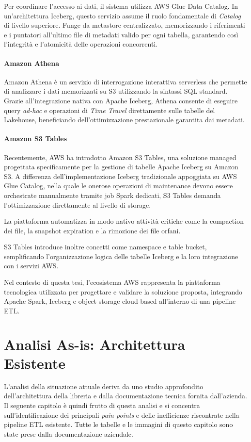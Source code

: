 \documentclass[12pt,a4paper,openright,twoside]{book}
\begin{document}
Per coordinare l'accesso ai dati, il sistema utilizza AWS Glue Data Catalog. 
In un'architettura Iceberg, questo servizio assume il ruolo fondamentale di \textit{Catalog} di livello superiore. Funge da metastore centralizzato, memorizzando i riferimenti e i puntatori all'ultimo file di metadati valido per ogni tabella, garantendo così l'integrità e l'atomicità delle operazioni concorrenti.

\subsubsection{Amazon Athena}

Amazon Athena è un servizio di interrogazione interattiva serverless che permette di analizzare i dati memorizzati su S3 utilizzando la sintassi SQL standard. 
Grazie all'integrazione nativa con Apache Iceberg, Athena consente di eseguire query \textit{ad-hoc} e operazioni di \textit{Time Travel} direttamente sulle tabelle del Lakehouse, beneficiando dell'ottimizzazione prestazionale garantita dai metadati.

\subsubsection{Amazon S3 Tables}

Recentemente, AWS ha introdotto Amazon S3 Tables, una soluzione managed progettata specificamente per la gestione di tabelle Apache Iceberg su Amazon S3. 
A differenza dell'implementazione Iceberg tradizionale appoggiata su AWS Glue Catalog, nella quale le onerose operazioni di maintenance devono essere orchestrate manualmente tramite job Spark dedicati, S3 Tables demanda l'ottimizzazione direttamente al livello di storage. 

La piattaforma automatizza in modo nativo attività critiche come la compaction dei file, la snapshot expiration e la rimozione dei file orfani.

S3 Tables introduce inoltre concetti come namespace e table bucket, semplificando l’organizzazione logica delle tabelle Iceberg e la loro integrazione con i servizi AWS.

Nel contesto di questa tesi, l’ecosistema AWS rappresenta la piattaforma tecnologica utilizzata per progettare e validare la soluzione proposta, integrando Apache Spark, Iceberg e object storage cloud-based all’interno di una pipeline ETL.

\chapter{Analisi As-is: Architettura Esistente}
\label{chap:existing-architecture}
L'analisi della situazione attuale deriva da uno studio approfondito dell'architettura della libreria e dalla documentazione tecnica fornita dall'azienda.
Il seguente capitolo è quindi frutto di questa analisi e si concentra sull'identificazione dei principali \textit{pain points} e delle inefficienze riscontrate nella pipeline ETL esistente.
Tutte le tabelle e le immagini di questo capitolo sono state prese dalla documentazione aziendale.
\end{document}
